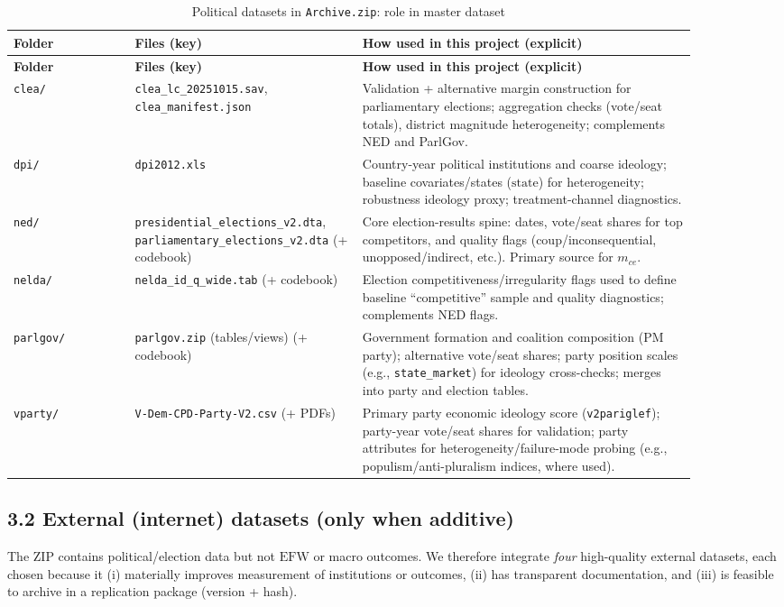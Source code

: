 \documentclass[11pt]{article}
\newcommand{\EFW}{\mathrm{EFW}}
\newcommand{\1}{\mathbf{1}}
\newcommand{\state}{\mathrm{state}}
\newcommand{\cid}{c}
\newcommand{\eid}{e}
\begin{document}
\begin{longtable}{p{0.16\linewidth}p{0.28\linewidth}p{0.44\linewidth}}
\caption{Political datasets in \texttt{Archive.zip}: role in master dataset}\label{tab:pol_sources}\\
\toprule
\textbf{Folder} & \textbf{Files (key)} & \textbf{How used in this project (explicit)}\\
\midrule
\endfirsthead
\toprule
\textbf{Folder} & \textbf{Files (key)} & \textbf{How used in this project (explicit)}\\
\midrule
\endhead
\texttt{clea/} &
\texttt{clea\_lc\_20251015.sav}, \texttt{clea\_manifest.json} &
Validation + alternative margin construction for parliamentary elections; aggregation checks (vote/seat totals), district magnitude heterogeneity; complements NED and ParlGov.\\
\texttt{dpi/} &
\texttt{dpi2012.xls} &
Country-year political institutions and coarse ideology; baseline covariates/states ($\state$) for heterogeneity; robustness ideology proxy; treatment-channel diagnostics.\\
\texttt{ned/} &
\texttt{presidential\_elections\_v2.dta}, \texttt{parliamentary\_elections\_v2.dta} (+ codebook) &
Core election-results spine: dates, vote/seat shares for top competitors, and quality flags (coup/inconsequential, unopposed/indirect, etc.). Primary source for $m_{\cid \eid}$.\\
\texttt{nelda/} &
\texttt{nelda\_id\_q\_wide.tab} (+ codebook) &
Election competitiveness/irregularity flags used to define baseline ``competitive'' sample and quality diagnostics; complements NED flags.\\
\texttt{parlgov/} &
\texttt{parlgov.zip} (tables/views) (+ codebook) &
Government formation and coalition composition (PM party); alternative vote/seat shares; party position scales (e.g., \texttt{state\_market}) for ideology cross-checks; merges into party and election tables.\\
\texttt{vparty/} &
\texttt{V-Dem-CPD-Party-V2.csv} (+ PDFs) &
Primary party economic ideology score (\texttt{v2pariglef}); party-year vote/seat shares for validation; party attributes for heterogeneity/failure-mode probing (e.g., populism/anti-pluralism indices, where used).\\
\bottomrule
\end{longtable}

\subsection*{3.2 External (internet) datasets (only when additive)}
The ZIP contains political/election data but not $\EFW$ or macro outcomes. We therefore integrate \emph{four} high-quality external datasets, each chosen because it (i) materially improves measurement of institutions or outcomes, (ii) has transparent documentation, and (iii) is feasible to archive in a replication package (version + hash).
\end{document}
